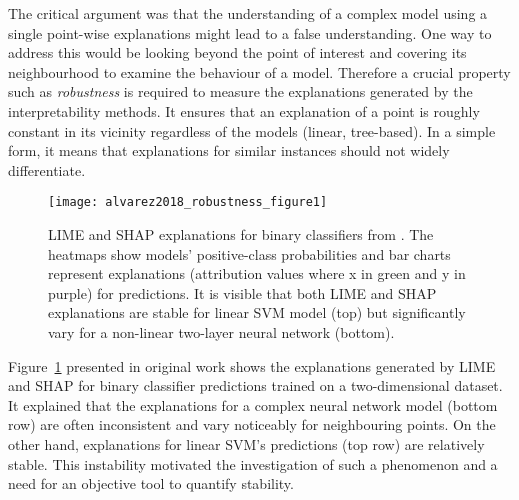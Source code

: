\documentclass[english]{tktltiki2}
\theoremstyle{definition}
\theoremstyle{remark}
\begin{document}
The critical argument was that the understanding of a complex model using a single point-wise explanations might lead to a false understanding. One way to address this would be looking beyond the point of interest and covering its neighbourhood to examine the behaviour of a model. Therefore a crucial property such as \textit{robustness} is required to measure the explanations generated by the interpretability methods. It ensures that an explanation of a point is roughly constant in its vicinity regardless of the models (linear, tree-based).  In a simple form, it means that explanations for similar instances should not widely differentiate.


\begin{figure}[H]
	\centering
	\vspace*{-2mm}
	\texttt{[image: alvarez2018\_robustness\_figure1]}
	\vspace*{-10mm}
	\caption{LIME and SHAP explanations for binary classifiers from \citet{alvarez2018robustness}. The heatmaps show models’ positive-class probabilities and bar charts represent explanations (attribution values where x in green and y in purple) for predictions. It is visible that both LIME and SHAP explanations are stable for linear SVM model (top) but significantly vary for a non-linear two-layer neural network (bottom).}
	\label{fig:alvarez2018_robustness_figure1}
\end{figure}

Figure~\ref{fig:alvarez2018_robustness_figure1} presented in original work \citep{alvarez2018robustness} shows the explanations generated by LIME \citep{ribeiro2016should} and SHAP \citep{lundberg2017unified} for binary classifier predictions trained on a two-dimensional dataset. It explained that the explanations for a complex neural network model (bottom row) are often inconsistent and vary noticeably for neighbouring points. On the other hand, explanations for linear SVM's predictions (top row) are relatively stable. This instability motivated the investigation of such a phenomenon and a need for an objective tool to quantify stability.
\end{document}
